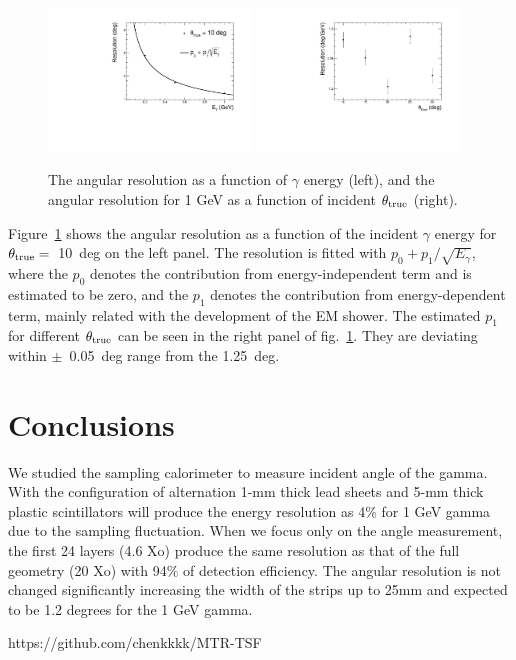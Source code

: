 \documentclass[jkps,preprint,fleqn,showpacs,showkeys]{revtex4}
\begin{document}
\begin{figure}[!hbt]
\includegraphics[width=0.48\textwidth]{figures/Fig5_reco_graph.pdf}
\includegraphics[width=0.48\textwidth]{figures/Fig5_reco_inc.pdf}
\caption{ The angular resolution as a function of $\gamma$ energy (left), and the angular resolution for 1 GeV as a function of incident $\theta_{\rm{true}}$ (right). }
\label{fig:angle_reco_dep_gr}
\end{figure}

Figure~\ref{fig:angle_reco_dep_gr} shows the angular resolution as a function of the incident $\gamma$ energy for $\theta_{\rm{true}}=$~10~deg on the left panel. The resolution is fitted with $p_{0} + p_{1}/\sqrt{E_{\gamma}}$, where the $p_{0}$ denotes the contribution from energy-independent term and is estimated to be zero, and the $p_{1}$ denotes the contribution from energy-dependent term, mainly related with the development of the EM shower. The estimated $p_{1}$ for different $\theta_{\rm{true}}$ can be seen in the right panel of fig.~\ref{fig:angle_reco_dep_gr}. They are deviating within $\pm$~0.05~deg range from the 1.25~deg.

\section{Conclusions}
We studied the sampling calorimeter to measure incident angle of the gamma. With the configuration of alternation 1-mm thick lead sheets and 5-mm thick plastic scintillators will produce the energy resolution as 4$\%$  for 1 GeV gamma due to the sampling fluctuation. When we focus only on the angle measurement, the first 24 layers (4.6 Xo) produce the same resolution as that of the full geometry (20 Xo) with 94$\%$ of detection efficiency. The angular resolution is not changed significantly increasing the width of the strips up to 25mm and expected to be 1.2 degrees for the 1 GeV gamma.

https://github.com/chenkkkk/MTR-TSF

\label{sec:con}



\begin{acknowledgments}
\end{acknowledgments}


\end{document}

